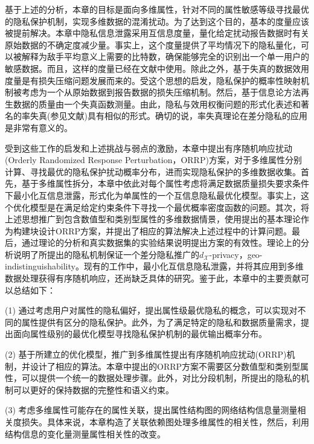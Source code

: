 基于上述的分析，本章的目标是面向多维属性，针对不同的属性敏感等级寻找最优的隐私保护机制，实现多维数据的混淆扰动。为了达到这个目的，基本的度量应该被提前解决。本章中隐私信息泄露采用互信息度量，量化给定扰动报告数据时有关原始数据的不确定度减少量。事实上，这个度量提供了平均情况下的隐私量化，可以被解释为敌手平均意义上需要的比特数，确保能够完全的识别出一个单一用户的敏感数据\cite{oya2017back}。而且，这样的度量已经在文献中使用。除此之外，基于失真的数据效用度量是有损失压缩问题\cite{sarwate2014a}发展而来的。受这个思想的启发，隐私保护的概率性映射机制被考虑为一个从原始数据到报告数据的损失压缩机制。然后，基于信息论方法再生数据的质量由一个失真函数测量。由此，隐私与效用权衡问题的形式化表述和著名的率失真(参见文献)具有相似的形式。确切的说，率失真理论在差分隐私的应用是非常有意义的。

受到这些工作的启发和上述挑战与弱点的激励，本章中提出有序随机响应扰动(Orderly Randomized Response Perturbation，ORRP)方案，对于多维属性分别计算、寻找最优的隐私保护扰动概率分布，进而实现隐私保护的多维数据收集。首先，基于多维属性拆分，本章中依此对每个属性考虑将满足数据质量损失要求条件下最小化互信息泄露，形式化为单属性的一个互信息隐私最优化模型。事实上，这个优化模型是在满足给定约束条件下寻找一个最优概率密度函数的问题。其次，将上述思想推广到包含数值型和类别型属性的多维数据情景，使用提出的基本理论作为构建块设计ORRP方案，并提出了相应的算法解决上述过程中的计算问题。最后，通过理论的分析和真实数据集的实验结果说明提出方案的有效性。理论上的分析说明了所提出的隐私机制保证一个差分隐私推广的$d_{\mathcal{X}}$-privacy\cite{chatzikokolakis2013broadening,bordenabe2014optimal}，geo-indistinguishability\cite{oya2017back}。现有的工作中，最小化互信息隐私泄露，并将其应用到多维数据处理获得有序随机响应，还尚缺乏具体的研究。鉴于此，本章中的主要贡献可以总结如下：

(1) 通过考虑用户对属性的隐私偏好，提出属性级最优隐私的概念，可以实现对不同的属性提供有区分的隐私保护。此外，为了满足特定的隐私和数据质量需求，提出面向属性级别的最优化模型寻找隐私保护机制的最优输出概率分布。


(2) 基于所建立的优化模型，推广到多维属性提出有序随机响应扰动(ORRP)机制，并设计了相应的算法。本章中提出的ORRP方案不需要区分数值型和类别型属性，可以提供一个统一的数据处理步骤。此外，对比分段机制\cite{wang2019collecting}，所提出的隐私的机制可以更好的保持数据的完整性和语义约束。

(3) 考虑多维属性可能存在的属性关联，提出属性结构图的网络结构信息量测量相关度损失。具体来说，本章构造了关联依赖图处理多维属性的相关性，然后，利用结构信息的变化量测量属性相关性的改变。

